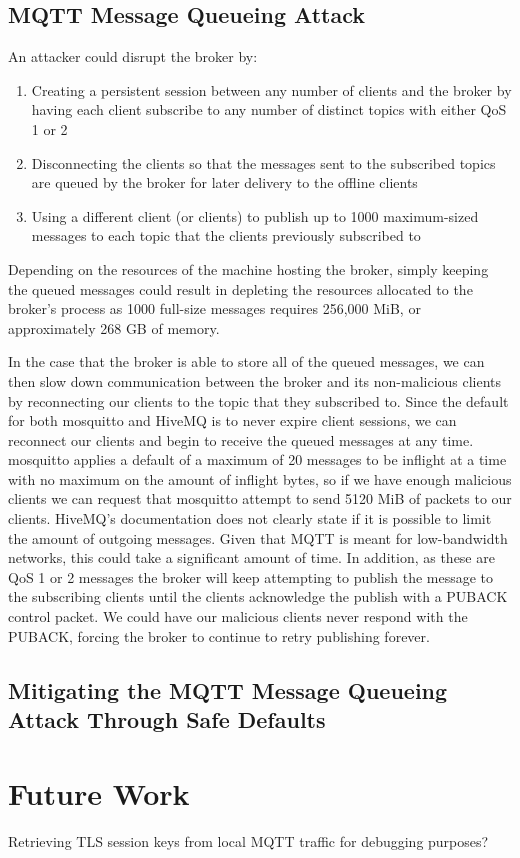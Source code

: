 \documentclass[12pt]{article}
\begin{document}
\subsection{MQTT Message Queueing Attack}
An attacker could disrupt the broker by:
\begin{enumerate}
	\item Creating a persistent session between any number of clients and the broker by having each client subscribe to any number of distinct topics with either QoS 1 or 2
	\item Disconnecting the clients so that the messages sent to the subscribed topics are queued by the broker for later delivery to the offline clients
	\item Using a different client (or clients) to publish up to 1000 maximum-sized messages to each topic that the clients previously subscribed to
\end{enumerate}
Depending on the resources of the machine hosting the broker, simply keeping the queued messages could result in depleting the resources allocated to the broker's process as 1000 full-size messages requires 256,000 MiB, or approximately 268 GB of memory.\par
In the case that the broker is able to store all of the queued messages, we can then slow down communication between the broker and its non-malicious clients by reconnecting our clients to the topic that they subscribed to. Since the default for both mosquitto and HiveMQ is to never expire client sessions, we can reconnect our clients and begin to receive the queued messages at any time. mosquitto applies a default of a maximum of 20 messages to be inflight at a time with no maximum on the amount of inflight bytes, so if we have enough malicious clients we can request that mosquitto attempt to send 5120 MiB of packets to our clients. HiveMQ's documentation does not clearly state if it is possible to limit the amount of outgoing messages\cite{hivemq-bw}. Given that MQTT is meant for low-bandwidth networks, this could take a significant amount of time. In addition, as these are QoS 1 or 2 messages the broker will keep attempting to publish the message to the subscribing clients until the clients acknowledge the publish with a PUBACK control packet. We could have our malicious clients never respond with the PUBACK, forcing the broker to continue to retry publishing forever. 
\subsection{Mitigating the MQTT Message Queueing Attack Through Safe Defaults}

\section{Future Work}
Retrieving TLS session keys from local MQTT traffic for debugging purposes?



\end{document}
